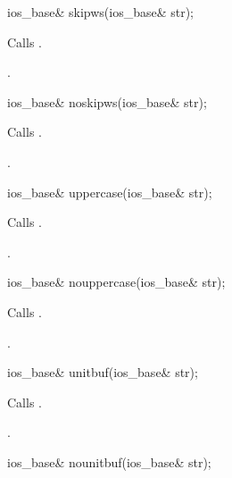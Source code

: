 %
\begin{itemdecl}
ios_base& skipws(ios_base& str);
\end{itemdecl}

\begin{itemdescr}
\pnum
\effects
Calls
.

\pnum
\returns
{}.
\end{itemdescr}

%
\begin{itemdecl}
ios_base& noskipws(ios_base& str);
\end{itemdecl}

\begin{itemdescr}
\pnum
\effects
Calls
.

\pnum
\returns
{}.
\end{itemdescr}

%
\begin{itemdecl}
ios_base& uppercase(ios_base& str);
\end{itemdecl}

\begin{itemdescr}
\pnum
\effects
Calls
.

\pnum
\returns
{}.
\end{itemdescr}

%
\begin{itemdecl}
ios_base& nouppercase(ios_base& str);
\end{itemdecl}

\begin{itemdescr}
\pnum
\effects
Calls
.

\pnum
\returns
{}.
\end{itemdescr}

%
\begin{itemdecl}
ios_base& unitbuf(ios_base& str);
\end{itemdecl}

\begin{itemdescr}
\pnum
\effects
Calls
.

\pnum
\returns
{}.
\end{itemdescr}

%
\begin{itemdecl}
ios_base& nounitbuf(ios_base& str);
\end{itemdecl}

